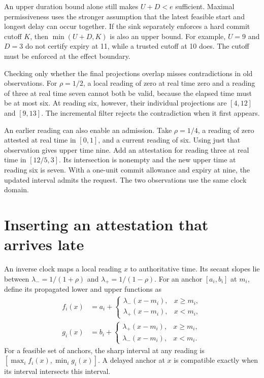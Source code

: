 \documentclass[11pt]{article}
\begin{document}
An upper duration bound alone still makes $U+D<e$ sufficient.
Maximal permissiveness uses the stronger assumption that the
latest feasible start and longest delay can occur together. If
the sink separately enforces a hard commit cutoff $K$, then
$\min(U+D,K)$ is also an upper bound. For example, $U=9$ and
$D=3$ do not certify expiry at 11, while a trusted cutoff at 10
does. The cutoff must be enforced at the effect boundary.

Checking only whether the final projections overlap misses
contradictions in old observations. For $\rho=1/2$, a local
reading of zero at real time zero and a reading of three at
real time seven cannot both be valid, because the elapsed time
must be at most six. At reading six, however, their individual
projections are $[4,12]$ and $[9,13]$. The incremental filter
rejects the contradiction when it first appears.

An earlier reading can also enable an admission. Take
$\rho=1/4$, a reading of zero attested at real time in $[0,1]$,
and a current reading of six. Using just that observation gives
upper time nine. Add an attestation for reading three at real
time in $[12/5,3]$. Its intersection is nonempty and the new
upper time at reading six is seven. With a one-unit commit
allowance and expiry at nine, the updated interval admits the
request. The two observations use the same clock domain.

\section{Inserting an attestation that arrives late}
An inverse clock maps a local reading $x$ to authoritative time.
Its secant slopes lie between $\lambda_-=1/(1+\rho)$ and
$\lambda_+=1/(1-\rho)$. For an anchor $[a_i,b_i]$ at $m_i$,
define its propagated lower and upper functions as
\[
\begin{aligned}
 f_i(x)&=a_i+\begin{cases}
 \lambda_-(x-m_i),&x\ge m_i,\\
 \lambda_+(x-m_i),&x<m_i,
 \end{cases}\\
 g_i(x)&=b_i+\begin{cases}
 \lambda_+(x-m_i),&x\ge m_i,\\
 \lambda_-(x-m_i),&x<m_i.
 \end{cases}
\end{aligned}
\]
For a feasible set of anchors, the sharp interval at any reading
is $[\max_i f_i(x),\min_i g_i(x)]$. A delayed anchor at $x$ is
compatible exactly when its interval intersects this interval.
\end{document}
